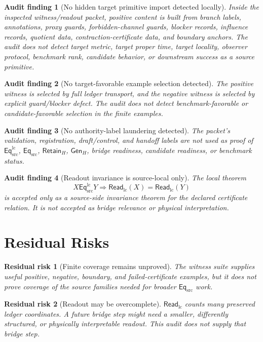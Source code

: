 \documentclass[11pt]{article}
\newcommand{\EqSrc}{\mathsf{Eq}_{\mathrm{src}}}
\newcommand{\EqLC}{\mathsf{Eq}_{\mathrm{src}}^{\mathrm{lc}}}
\newcommand{\ReadLC}{\mathsf{Read}_{\mathrm{lc}}}
\newcommand{\RetainH}{\mathsf{Retain}_{H}}
\newcommand{\GenH}{\mathsf{Gen}_{H}}
\newtheorem{auditfinding}{Audit finding}
\newtheorem{residualrisk}{Residual risk}
\begin{document}
\begin{auditfinding}[No hidden target primitive import detected locally]
Inside the inspected witness/readout packet, positive content is built
from branch labels, annotations, proxy guards, forbidden-channel
guards, blocker records, influence records, quotient data,
contraction-certificate data, and boundary anchors. The audit does not
detect target metric, target proper time, target locality, observer
protocol, benchmark rank, candidate behavior, or downstream success as
a source primitive.
\end{auditfinding}

\begin{auditfinding}[No target-favorable example selection detected]
The positive witness is selected by full ledger transport, and the
negative witness is selected by explicit guard/blocker defect. The
audit does not detect benchmark-favorable or candidate-favorable
selection in the finite examples.
\end{auditfinding}

\begin{auditfinding}[No authority-label laundering detected]
The packet's validation, registration, draft/control, and handoff
labels are not used as proof of \(\EqLC\), \(\EqSrc\), \(\RetainH\),
\(\GenH\), bridge readiness, candidate readiness, or benchmark status.
\end{auditfinding}

\begin{auditfinding}[Readout invariance is source-local only]
The local theorem
\[
    X\EqLC Y \Longrightarrow \ReadLC(X)=\ReadLC(Y)
\]
is accepted only as a source-side invariance theorem for the declared
certificate relation. It is not accepted as bridge relevance or
physical interpretation.
\end{auditfinding}

\section{Residual Risks}

\begin{residualrisk}[Finite coverage remains unproved]
The witness suite supplies useful positive, negative, boundary, and
failed-certificate examples, but it does not prove coverage of the
source families needed for broader \(\EqSrc\) work.
\end{residualrisk}

\begin{residualrisk}[Readout may be overcomplete]
\(\ReadLC\) counts many preserved ledger coordinates. A future bridge
step might need a smaller, differently structured, or physically
interpretable readout. This audit does not supply that bridge step.
\end{residualrisk}
\end{document}
